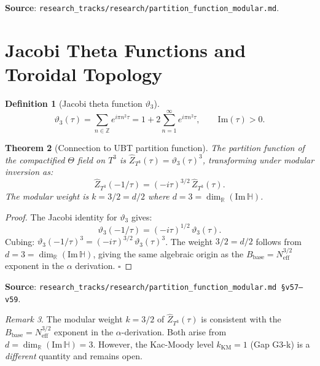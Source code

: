\documentclass[11pt,a4paper]{article}
\newtheorem{theorem}{Theorem}[section]
\theoremstyle{definition}
\newtheorem{definition}[theorem]{Definition}
\theoremstyle{remark}
\newtheorem{remark}[theorem]{Remark}
\begin{document}
\noindent\textbf{Source}: \texttt{research\_tracks/research/partition\_function\_modular.md}.

\section{Jacobi Theta Functions and Toroidal Topology}\label{sec:jacobi}

\begin{definition}[Jacobi theta function $\vartheta_3$]
\begin{equation}\label{eq:theta3}
  \vartheta_3(\tau)
  = \sum_{n\in\mathbb{Z}} e^{i\pi n^2\tau}
  = 1 + 2\sum_{n=1}^\infty e^{i\pi n^2\tau},
  \qquad \mathrm{Im}(\tau) > 0.
\end{equation}
\end{definition}

\begin{theorem}[Connection to UBT partition function]\label{thm:partition}
The partition function of the compactified $\Theta$ field on $T^3$
is $\hat{Z}_{T^3}(\tau) = \vartheta_3(\tau)^3$, transforming under
modular inversion as:
\begin{equation}\label{eq:modular_transform}
  \hat{Z}_{T^3}(-1/\tau)
  = (-i\tau)^{3/2}\,\hat{Z}_{T^3}(\tau).
\end{equation}
The modular weight is $k = 3/2 = d/2$ where $d = 3 = \dim_\mathbb{R}(\mathrm{Im}\,\mathbb{H})$.
\end{theorem}

\begin{proof}
The Jacobi identity for $\vartheta_3$ gives:
\begin{equation}
  \vartheta_3(-1/\tau) = (-i\tau)^{1/2}\,\vartheta_3(\tau).
\end{equation}
Cubing: $\vartheta_3(-1/\tau)^3 = (-i\tau)^{3/2}\,\vartheta_3(\tau)^3$.
The weight $3/2 = d/2$ follows from $d = 3 = \dim_\mathbb{R}(\mathrm{Im}\,\mathbb{H})$,
giving the same algebraic origin as the $B_{\mathrm{base}} = N_{\mathrm{eff}}^{3/2}$
exponent in the $\alpha$ derivation. $\square$
\end{proof}

\noindent\textbf{Source}: \texttt{research\_tracks/research/partition\_function\_modular.md \S v57--v59}.

\begin{remark}
The modular weight $k = 3/2$ of $\hat{Z}_{T^3}(\tau)$ is consistent with the
$B_{\mathrm{base}} = N_{\mathrm{eff}}^{3/2}$ exponent in the $\alpha$-derivation.
Both arise from $d = \dim_\mathbb{R}(\mathrm{Im}\,\mathbb{H}) = 3$.
However, the Kac-Moody level $k_{\mathrm{KM}} = 1$ (Gap G3-k) is a \emph{different}
quantity and remains open.
\end{remark}
\end{document}
